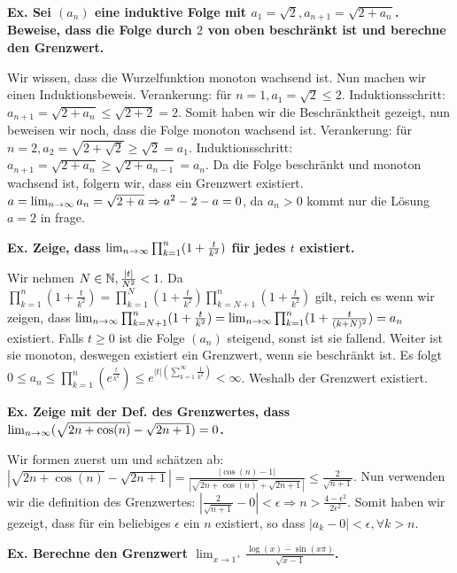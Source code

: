 

\textbf{Ex. Sei $(a_n)$ eine induktive Folge mit $a_1 = \sqrt{2}, a_{n+1} = \sqrt{2 + a_n}$. Beweise, dass die Folge durch $2$ von oben beschränkt ist und berechne den Grenzwert.} 

Wir wissen, dass die Wurzelfunktion monoton wachsend ist. Nun machen wir einen Induktionsbeweis. Verankerung:
für $n = 1, a_1 = \sqrt{2} \leq 2$. Induktionsschritt: $a_{n+1} = \sqrt{2 + a_n} \leq \sqrt{2 + 2} = 2$.
Somit haben wir die Beschränktheit gezeigt, nun beweisen wir noch, dass die Folge monoton wachsend ist.
Verankerung: für $n = 2, a_2 = \sqrt{2 + \sqrt{2}} \geq \sqrt{2} = a_1$. Induktionsschritt:
$a_{n+1} = \sqrt{2 + a_n} \geq \sqrt{2 + a_{n-1}} = a_n$. Da die Folge beschränkt und monoton wachsend ist,
folgern wir, dass ein Grenzwert existiert. $a = \lim_{n \rightarrow \infty} a_n = \sqrt{2 + a} \Rightarrow a^2 - 2 - a = 0$,
da $a_n > 0$ kommt nur die Lösung $a = 2$ in frage. \medskip

\textbf{Ex. Zeige, dass $\lim_{n \rightarrow \infty} \prod_{k = 1}^n(1 + \frac{t}{k^2})$ für jedes $t$ existiert.} 

Wir nehmen $N \in \mathbb{N}, \frac{|t|}{N^2} < 1$. Da $\prod_{k = 1}^n(1 + \frac{t}{k^2}) = \prod_{k = 1}^N(1 
+ \frac{t}{k^2}) \prod_{k = N + 1}^n(1 + \frac{t}{k^2})$ gilt, reich es wenn wir zeigen, dass 
$\lim_{n \rightarrow \infty} \prod_{k = N+1}^n(1 + \frac{t}{k^2}) = \lim_{n \rightarrow \infty} \prod_{k = 1}^n(1 + \frac{t}{(k + N)^2}) = a_n$ existiert.
Falls $t \geq 0$ ist die Folge $(a_n)$ steigend, sonst ist sie fallend. Weiter ist sie monoton, deswegen
existiert ein Grenzwert, wenn sie beschränkt ist. Es folgt $0 \leq a_n \leq \prod_{k = 1}^n(e^{\frac{t}{k^2}})
\leq e^{|t|(\sum_{k = 1}^\infty\frac{1}{k^2})} < \infty$. Weshalb der Grenzwert existiert. \medskip

\textbf{Ex. Zeige mit der Def. des Grenzwertes, dass $\lim_{n \rightarrow \infty} (\sqrt{2n + \cos(n)} - \sqrt{2n + 1}) = 0$.}

Wir formen zuerst um und schätzen ab: $|\sqrt{2n + \cos(n)} - \sqrt{2n + 1}| = \frac{|\cos(n)-1|}{|\sqrt{2n + \cos(n)} + \sqrt{2n + 1}|}
\leq \frac{2}{\sqrt{n + 1}}$. Nun verwenden wir die definition des Grenzwertes: $|\frac{2}{\sqrt{n + 1}} - 0| < \epsilon 
\Rightarrow n > \frac{4 - \epsilon^2}{2 \epsilon^2}$. Somit haben wir gezeigt, dass für ein beliebiges
$\epsilon$ ein $n$ existiert, so dass $|a_k - 0| < \epsilon, \forall k > n$. \medskip

\textbf{Ex. Berechne den Grenzwert $\lim_{x \to 1^+} \frac{\log(x)-\sin(x\pi)}{\sqrt{x-1}}$.}

